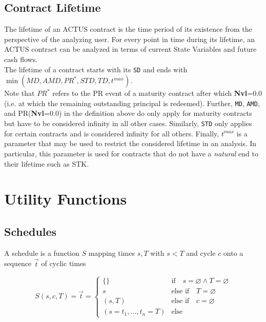 \documentclass[9pt,oneside]{amsart}
\newcommand{\attr}[1]{\texttt{#1}}
\newcommand{\sdl}[3]{S(#1,#2,#3)}
\newcommand{\undef}{\varnothing}
\newcommand{\tmax}{t^{max}}
\begin{document}
\begin{multicols}{2}
\subsection{Contract Lifetime}

The lifetime of an ACTUS contract is the time period of its existence from the perspective of the analyzing user. For every point in time during its lifetime, an ACTUS contract can be analyzed in terms of current State Variables and future cash flows.\\

The lifetime of a contract starts with its \attr{SD} and ends with $\min(MD, AMD, PR^*, STD, TD,\tmax)$.\\

Note that $PR^*$ refers to the PR event of a maturity contract after which \textbf{Nvl}=0.0 (i.e. at which the remaining outstanding principal is redeemed). Further, \attr{MD}, \attr{AMD}, and PR(\textbf{Nvl}=0.0) in the definition above do only apply for maturity contracts but have to be considered infinity in all other cases. Similarly, \attr{STD} only applies for certain contracts and is considered infinity for all others. Finally, $\tmax$ is a parameter that may be used to restrict the considered lifetime in an analysis. In particular, this parameter is used for contracts that do not have a \textit{natural} end to their lifetime such as STK.



\section{Utility Functions}

\subsection{Schedules}\label{sec:schedules}

A schedule is a function $S$ mapping times $s,T$ with $s<T$ and cycle $c$ onto a sequence $\vec{t}$ of cyclic times

\[
	\sdl{s}{c}{T}=\vec{t}=\begin{cases} \{\} & \text{if}\quad s=\undef\land T=\undef\\ 
					s & \text{else if}\quad T=\undef\\
					(s,T) & \text{else if}\quad c=\undef\\
					(s=t_1,...,t_n=T) & \text{else} \end{cases}
\]


\end{multicols}
\end{document}
